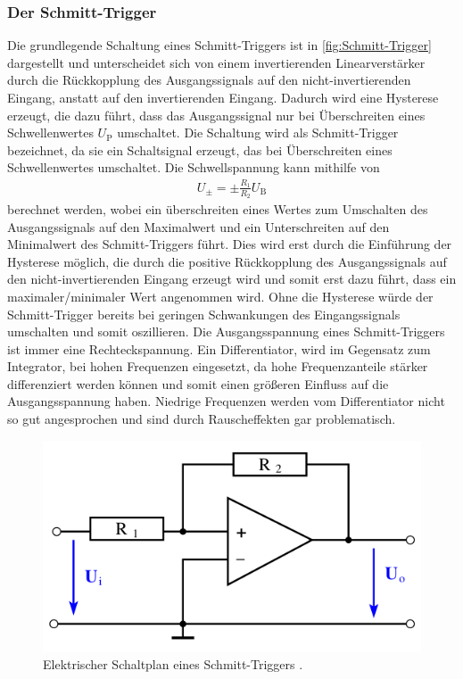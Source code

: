 \subsubsection{Der Schmitt-Trigger}\label{subsubsec:Schmitt-Trigger}    %
Die grundlegende Schaltung eines Schmitt-Triggers ist in \autoref{fig:Schmitt-Trigger} dargestellt und unterscheidet sich von einem invertierenden Linearverstärker durch die Rückkopplung des Ausgangssignals auf den nicht-invertierenden Eingang, anstatt auf den invertierenden Eingang.
Dadurch wird eine Hysterese erzeugt, die dazu führt, dass das Ausgangssignal nur bei Überschreiten eines Schwellenwertes $U_\text{P}$ umschaltet.
Die Schaltung wird als Schmitt-Trigger bezeichnet, da sie ein Schaltsignal erzeugt, das bei Überschreiten eines Schwellenwertes umschaltet.
Die Schwellspannung kann mithilfe von
\begin{align}
    U_\pm = \pm\frac{R_1}{R_2}U_\text{B}
\end{align}
berechnet werden, wobei ein überschreiten eines Wertes zum Umschalten des Ausgangssignals auf den Maximalwert und ein Unterschreiten auf den Minimalwert des Schmitt-Triggers führt.
Dies wird erst durch die Einführung der Hysterese möglich, die durch die positive Rückkopplung des Ausgangssignals auf den nicht-invertierenden Eingang erzeugt wird und somit erst dazu führt, dass ein maximaler/minimaler Wert angenommen wird.
Ohne die Hysterese würde der Schmitt-Trigger bereits bei geringen Schwankungen des Eingangssignals umschalten und somit oszillieren.
Die Ausgangsspannung eines Schmitt-Triggers ist immer eine Rechteckspannung.
Ein Differentiator, wird im Gegensatz zum Integrator, bei hohen Frequenzen eingesetzt, da hohe Frequenzanteile stärker differenziert werden können und somit einen größeren Einfluss auf die Ausgangsspannung haben.
Niedrige Frequenzen werden vom Differentiator nicht so gut angesprochen und sind durch Rauscheffekten gar problematisch.
\begin{figure}[H]
	\centering
    \includegraphics[width=0.6\linewidth]{figures/Schmitt-Trigger.png}
	\caption{Elektrischer Schaltplan eines Schmitt-Triggers \cite{Anleitung51}.}
	\label{fig:Schmitt-Trigger}
\end{figure}


